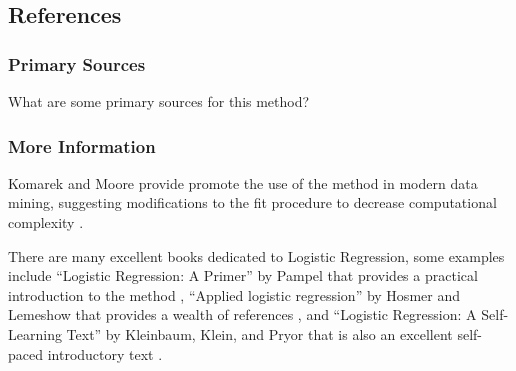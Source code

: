 \subsection{References}

\subsubsection{Primary Sources}

What are some primary sources for this method?

\subsubsection{More Information}
Komarek and Moore provide promote the use of the method in modern data mining, suggesting modifications to the fit procedure to decrease computational complexity \cite{Komarek2005}.

There are many excellent books dedicated to Logistic Regression, some examples include 
``Logistic Regression: A Primer'' by Pampel that provides a practical introduction to the method \cite{Pampel2000}, ``Applied logistic regression'' by Hosmer and Lemeshow that provides a wealth of references \cite{Hosmer2000}, and ``Logistic Regression: A Self-Learning Text'' by Kleinbaum, Klein, and Pryor that is also an excellent self-paced introductory text \cite{Kleinbaum2010}.


